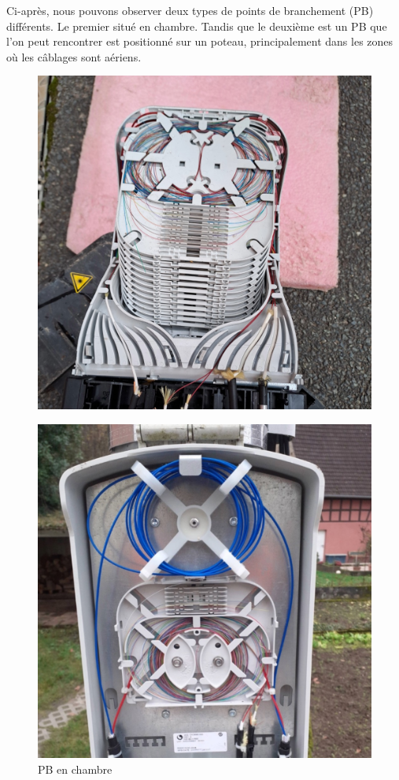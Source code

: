 \documentclass[12pt, a4paper]{article}
\begin{document}
\newpage
Ci-après, nous pouvons observer deux types de points de branchement (PB)
différents. Le premier situé en chambre. Tandis que le deuxième est un PB que l'on peut
rencontrer est positionné sur un poteau, principalement dans les zones où
les câblages sont aériens.
\begin{figure}[htbp]
    \centering
    \begin{minipage}[b]{0.4\textwidth}
		{\includegraphics[width=\textwidth]{img/pbc.jpg}}
      \caption{PB en chambre}
    \end{minipage}
    \hspace{0.5cm} %
    \begin{minipage}[b]{0.4\textwidth}
      \includegraphics[width=\textwidth]{img/pbp.jpg}

\end{minipage}
\end{figure}
\end{document}
